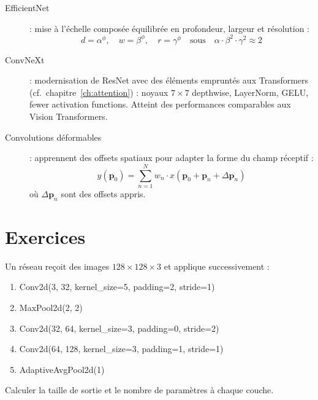 \begin{sota}[title=\textbf{Architectures CNN modernes}]
\begin{description}
  \item[EfficientNet] \cite{tan2019efficientnet} : mise \`a l'\'echelle
    compos\'ee \'equilibr\'ee en profondeur, largeur et r\'esolution :
    \begin{equation}
      d = \alpha^\phi, \quad w = \beta^\phi, \quad r = \gamma^\phi
      \quad \text{sous} \quad \alpha \cdot \beta^2 \cdot \gamma^2 \approx 2
    \end{equation}

  \item[ConvNeXt] \cite{liu2022convnet} : modernisation de ResNet avec des
    \'el\'ements emprunt\'es aux Transformers (cf.\ chapitre~\ref{ch:attention}) :
    noyaux $7 \times 7$ depthwise, LayerNorm, GELU, fewer activation functions.
    Atteint des performances comparables aux Vision Transformers.

  \item[Convolutions d\'eformables] \cite{dai2017deformable} : apprennent des
    offsets spatiaux pour adapter la forme du champ r\'eceptif :
    \begin{equation}
      y(\mathbf{p}_0) = \sum_{n=1}^{N} w_n \cdot x(\mathbf{p}_0 + \mathbf{p}_n + \Delta\mathbf{p}_n)
    \end{equation}
    o\`u $\Delta\mathbf{p}_n$ sont des offsets appris.
\end{description}
\end{sota}

\section{Exercices}
\label{sec:cnn-exercices}

\begin{exercice}
Un r\'eseau re\c{c}oit des images $128 \times 128 \times 3$ et applique
successivement :
\begin{enumerate}
  \item Conv2d(3, 32, kernel\_size=5, padding=2, stride=1)
  \item MaxPool2d(2, 2)
  \item Conv2d(32, 64, kernel\_size=3, padding=0, stride=2)
  \item Conv2d(64, 128, kernel\_size=3, padding=1, stride=1)
  \item AdaptiveAvgPool2d(1)
\end{enumerate}
Calculer la taille de sortie et le nombre de param\`etres \`a chaque couche.
\end{exercice}

